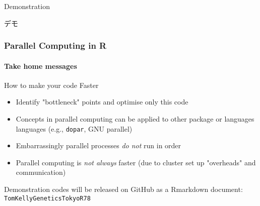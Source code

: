 \documentclass{beamer}
\begin{document}
       \begin{frame}
   
   \begin{center}
   
   \LARGE{Demonstration}\\
   \LARGE{\begin{CJK}{UTF8}{min}デモ\end{CJK}}
   
   \end{center}

  \end{frame}  
  
      \begin{frame}
    \frametitle{ Parallel Computing in R}
    \framesubtitle{Take home messages}
  
  How to make your code Faster
  
      
     \begin{itemize}
    \item Identify "bottleneck" points and optimise only this code
    \bigskip
    
   \item Concepts in parallel computing can be applied to other package or languages languages (e.g., \texttt{dopar}, GNU parallel)
    \bigskip
           
	\item Embarrassingly parallel processes \textit{do not} run in order
      \bigskip
      
     \item Parallel computing is \textit{not always} faster (due to cluster set up "overheads" and communication)
     
     \end{itemize}
     
     Demonstration  codes will be released on GitHub as a Rmarkdown document: \texttt{TomKellyGenetics\/TokyoR78}
      \end{frame}
\end{document}

